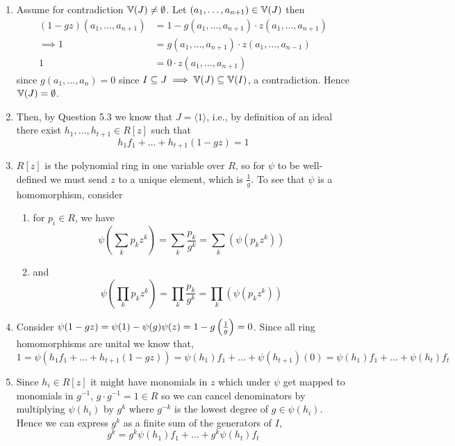 \documentclass[Notebook.tex]{subfiles}
\begin{document}
\begin{solution}
    \bbni
    \begin{enumerate}
        \item Assume for contradiction $\mathbb V(J) \neq \emptyset$. Let $(a_1, \ldots, a_{n+1}) \in \mathbb V(J)$ then 
        \begin{align*}
            (1 - gz)(a_1, \ldots, a_{n+1}) &= 1 - g(a_1, \ldots, a_{n+1}) \cdot z(a_1, \ldots, a_{n+1}) \\
            \implies 1 &= g(a_1, \ldots, a_{n+1}) \cdot z(a_1, \ldots, a_{n-1}) \\ 
            1 &= 0 \cdot z(a_1, \ldots, a_{n+1})
        \end{align*}
        since $g(a_1, \ldots, a_n) = 0$ since $I \subseteq J \implies \mathbb V(J) \subseteq \mathbb V(I)$, a contradiction. Hence $\mathbb V(J) = \emptyset$. 

        \item Then, by Question 5.3 we know that $J = \langle 1 \rangle$, i.e., by definition of an ideal there exist $h_1, \ldots, h_{t+1} \in R[z]$ such that 
        \[h_1f_1 + \ldots + h_{t+1}(1-gz) = 1\]

        \item $R[z]$ is the polynomial ring in one variable over $R$, so for $\psi$ to be well-defined we must send $z$ to a unique element, which is $\frac{1}{g}$. To see that $\psi$ is a homomorphism, consider 
        
        \begin{enumerate}
            \item for $p_i \in R$, we have 
            \[\psi\left(\sum_k p_k z^k\right)= \sum_k \frac{p_k}{g^k} = \sum_k\left(\psi(p_kz^k)\right)\] 
            \item and 
             \[\psi \left(\prod_k p_k z^k\right) = \prod_k \frac{p_k}{g^k} = \prod_k\left(\psi(p_kz^k)\right)\] 
        \end{enumerate}
        
        \item Consider $\psi(1-gz) = \psi(1) - \psi(g)\psi(z) = 1 - g\left(\frac{1}{g}\right) = 0$. Since all ring homomorphisms are unital we know that, 
        \[1 = \psi(h_1f_1 + \ldots + h_{t+1}(1-gz)) = \psi(h_1) f_1 + \ldots + \psi(h_{t+1}) (0) = \psi(h_1) f_1 + \ldots + \psi(h_t)f_t\]

        \item Since $h_i \in R[z]$ it might have monomials in $z$ which under $\psi$ get mapped to monomials in $g^{-1}$, $g \cdot g^{-1} = 1 \in R$ so we can cancel denominators by multiplying $\psi(h_i)$ by $g^k$ where $g^{-k}$ is the lowest degree of $g \in \psi(h_i)$. Hence we can express $g^k$ as a finite sum of the generators of $I$,
        \[g^k = g^k \psi(h_1) f_1 + \ldots + g^k\psi(h_t) f_t\]


\end{enumerate}
\end{solution}
\end{document}
